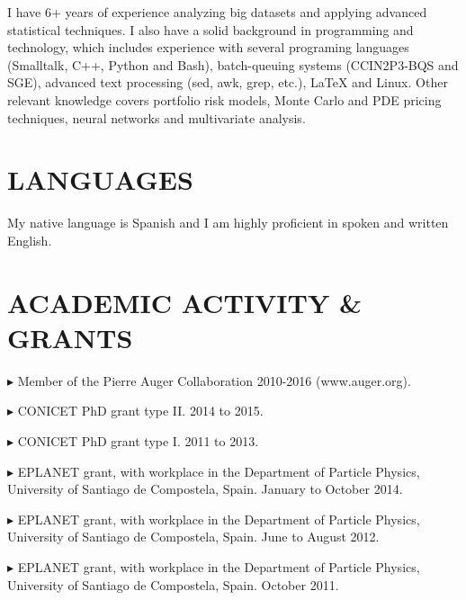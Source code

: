 \documentclass[letterpaper]{article}
\renewenvironment{itemize}{
  \begin{list}{}{
    \setlength{\leftmargin}{1.5em}
  }
}{
  \end{list}
}
\begin{document}
I have 6+ years of experience analyzing big datasets and applying advanced statistical techniques. I also have a solid background in programming and technology, which includes experience with several programing languages (Smalltalk, C++, Python and Bash), batch-queuing systems (CCIN2P3-BQS and SGE), advanced text processing (sed, awk, grep, etc.), \LaTeX{} and Linux. Other relevant knowledge covers portfolio risk models, Monte Carlo and PDE pricing techniques, neural networks and multivariate analysis.


\section*{LANGUAGES}

My native language is Spanish and I am highly proficient in spoken and written English.

\section*{ACADEMIC ACTIVITY \& GRANTS} 
   \begin{itemize} \itemsep -0pt  %
   \item $\blacktriangleright$ Member of the Pierre Auger Collaboration 2010-2016 (www.auger.org).
   \item $\blacktriangleright$ CONICET PhD grant type II. 2014 to 2015. 
   \item $\blacktriangleright$ CONICET PhD grant type I. 2011 to 2013. 
   \item $\blacktriangleright$ EPLANET grant, with workplace in the Department of Particle Physics, University of Santiago de Compostela, Spain. January to October 2014.
   \item $\blacktriangleright$ EPLANET grant, with workplace in the Department of Particle Physics, University of Santiago de Compostela, Spain. June to August 2012.
   \item $\blacktriangleright$ EPLANET grant, with workplace in the Department of Particle Physics, University of Santiago de Compostela, Spain. October 2011.
 \end{itemize}

 
\end{document}
